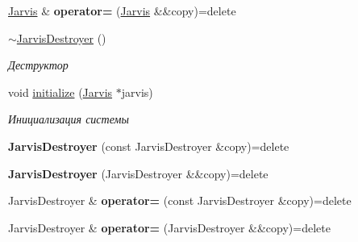 \begin{DoxyCompactItemize}
\hyperlink{classJarvis_1_1Jarvis}{Jarvis} \& {\bfseries operator=} (\hyperlink{classJarvis_1_1Jarvis}{Jarvis} \&\&copy)=delete
\item 
\mbox{\label{classJarvis_1_1Jarvis_af74ffc81a286c827aed0ffc7efea1973}} 
\hyperlink{classJarvis_1_1Jarvis_af74ffc81a286c827aed0ffc7efea1973}{$\sim$\+Jarvis\+Destroyer} ()
\begin{DoxyCompactList}\small\item\em Деструктор \end{DoxyCompactList}\item 
void \hyperlink{classJarvis_1_1Jarvis_a1453f3e7f2587b7b884525c75d8b8cf5}{initialize} (\hyperlink{classJarvis_1_1Jarvis}{Jarvis} $\ast$jarvis)
\begin{DoxyCompactList}\small\item\em Инициализация системы \end{DoxyCompactList}\item 
\mbox{\label{classJarvis_1_1Jarvis_a22a6798b7868c1f17ecf5023edbd252b}} 
{\bfseries Jarvis\+Destroyer} (const Jarvis\+Destroyer \&copy)=delete
\item 
\mbox{\label{classJarvis_1_1Jarvis_a382b3b739ed3881ae2d5a93b0743e72c}} 
{\bfseries Jarvis\+Destroyer} (Jarvis\+Destroyer \&\&copy)=delete
\item 
\mbox{\label{classJarvis_1_1Jarvis_a449b426d29488b2004e8431dfeeb204b}} 
Jarvis\+Destroyer \& {\bfseries operator=} (const Jarvis\+Destroyer \&copy)=delete
\item 
\mbox{\label{classJarvis_1_1Jarvis_ace5b58fadb50698bbf9db3e0d7af3a2f}} 
Jarvis\+Destroyer \& {\bfseries operator=} (Jarvis\+Destroyer \&\&copy)=delete
\end{DoxyCompactItemize}
